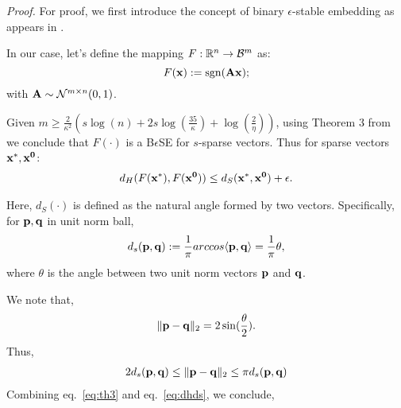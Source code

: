 \textit{Proof.} For proof, we first introduce the concept of binary $\epsilon$-stable embedding as appears in .
 
In our case, let's define the mapping $F: {\mathbb{R}}^n \rightarrow \mathcal{B}^m$  as:
$$
F(\mathbf{x}):= \mathrm{sgn}(\mathbf{Ax});
$$
with $\mathbf{A} \sim \mathcal{N}^{m \times n}(0,1)$.

Given $m \geq \frac{2}{\kappa^2}\left(s\log{(n)} + 2s\log{\left(\frac{35}{\kappa}\right)}+\log{\left(\frac{2}{\eta}\right)}\right)$, using Theorem 3 from  we conclude that $F(\cdot)$ is a B$\epsilon$SE for $s$-sparse vectors.
Thus for sparse vectors $\mathbf{x^*, x^0}$:
\begin{align}
\label{eq:th3}
d_H(F\mathbf{(x^*)},F\mathbf{(x^0)}) \leq d_S(\mathbf{x^*,x^0}) + \epsilon.
\end{align}

Here, $d_S(\cdot)$ is defined as the natural angle formed by two vectors. Specifically, for $\mathbf{p,q}$ in unit norm ball,
$$
d_s(\mathbf{p},\mathbf{q}) := \frac{1}{\pi}arccos\langle\mathbf{p},\mathbf{q}\rangle = \frac{1}{\pi}\theta,
$$
where $\theta$ is the angle between two unit norm vectors $\mathbf{p}$ and $\mathbf{q}$.

We note that,
$$
\|\mathbf{p-q}\|_2 = 2\sin(\frac{\theta}{2}).
$$
Thus,
\begin{align}
\label{eq:dhds}
2d_s(\mathbf{p},\mathbf{q}) \leq \|\mathbf{p - q}\|_2 \leq \pi d_s(\mathbf{p},\mathbf{q})
\end{align}
Combining eq.~\ref{eq:th3} and eq.~\ref{eq:dhds}, we conclude,

